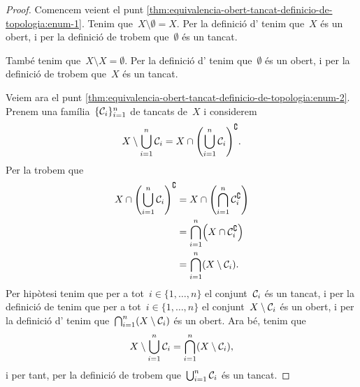 \documentclass[../../main.tex]{subfiles}
\begin{document}
    \begin{proof}
        Comencem veient el punt \eqref{thm:equivalencia-obert-tancat-definicio-de-topologia:enum-1}.
        Tenim que~\(X\setminus\emptyset=X\).
        Per la definició d' tenim que~\(X\) és un obert, i per la definició de  trobem que~\(\emptyset\) és un tancat.

        També tenim que~\(X\setminus X=\emptyset\).
        Per la definició d' tenim que~\(\emptyset\) és un obert, i per la definició de  trobem que~\(X\) és un tancat.

        Veiem ara el punt \eqref{thm:equivalencia-obert-tancat-definicio-de-topologia:enum-2}.
        Prenem una família~\(\{\mathcal{C}_{i}\}_{i=1}^{n}\) de tancats de~\(X\) i considerem
        \[
            X\setminus\bigcup_{i=1}^{n}\tancat{C}_{i}=X\cap\left(\bigcup_{i=1}^{n}\tancat{C}_{i}\right)^{\complement}.
        \]
        Per la  trobem que
        \begin{align*}
            X\cap\left(\bigcup_{i=1}^{n}\tancat{C}_{i}\right)^{\complement}&=X\cap\left(\bigcap_{i=1}^{n}\tancat{C}_{i}^{\complement}\right) \\
            &=\bigcap_{i=1}^{n}\left(X\cap\tancat{C}_{i}^{\complement}\right) \\
            &=\bigcap_{i=1}^{n}\left(X\setminus\tancat{C}_{i}\right).
        \end{align*}
        Per hipòtesi tenim que per a tot~\(i\in\{1,\dots,n\}\) el conjunt~\(\mathcal{C}_{i}\) és un tancat, i per la definició de  tenim que per a tot~\(i\in\{1,\dots,n\}\) el conjunt~\(X\setminus\mathcal{C}_{i}\) és un obert, i per la definició d' tenim que~\(\bigcap_{i=1}^{n}\left(X\setminus\tancat{C}_{i}\right)\) és un obert.
        Ara bé, tenim que
        \[
            X\setminus\bigcup_{i=1}^{n}\tancat{C}_{i}=\bigcap_{i=1}^{n}\left(X\setminus\tancat{C}_{i}\right),
        \]
        i per tant, per la definició de  trobem que~\(\bigcup_{i=1}^{n}\mathcal{C}_{i}\) és un tancat.


\end{proof}
\end{document}
